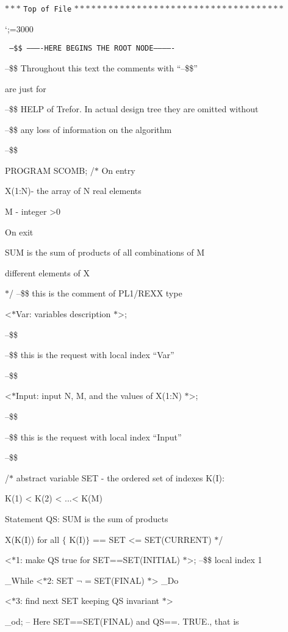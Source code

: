\baselineskip=12pt
$***$ {\tt Top of File} $*************************************$
{\obeylines \sfcode`;=3000
{\tt
\qquad--\$\$ ----------HERE BEGINS THE ROOT NODE-------------

\qquad--\$\$ Throughout this text the comments with ``--\$\$''

\qquad \qquad \qquad \qquad are just for

\qquad--\$\$ HELP of Trefor. In actual design tree they are
\qquad \qquad \qquad \qquad omitted without

\qquad--\$\$ any loss of information on the algorithm

\qquad--\$\$

PROGRAM SCOMB;
\qquad /$*$ On entry

\qquad \quad X(1:N)- the array of N real elements

\qquad \qquad M - integer >0

\qquad On exit

\qquad \qquad SUM is the sum of products of all combinations of M

\qquad \qquad different elements of X

\qquad $*$/ --\$\$ this is the comment of PL1/REXX type

<$*$Var: variables description $*$>;

\qquad--\$\$

\qquad--\$\$ this is the request with local index ``Var''

\qquad--\$\$

<$*$Input: input N, M, and the values of X(1:N) $*$>;

\qquad--\$\$

\qquad--\$\$  this is the request with local index ``Input''

\qquad--\$\$

\qquad /$*$ abstract variable  SET - the ordered set of indexes K(I):

\qquad \qquad K(1) < K(2) < ...< K(M)

\qquad Statement QS:   SUM is the sum of products

\qquad \qquad \qquad X(K(I)) for all $\{$ K(I)$\}$ == SET <=
SET(CURRENT) $*$/

\qquad <$*$1: make QS true for
SET==SET(INITIAL) $*$>; --\$\$ local index 1

\qquad \_While <$*$2:  SET $\neg$ = SET(FINAL) $*$> \_Do

\qquad \qquad <$*$3: find next  SET  keeping QS invariant $*$>

\qquad \_od; -- Here SET==SET(FINAL) and QS==. TRUE., that is

}}
